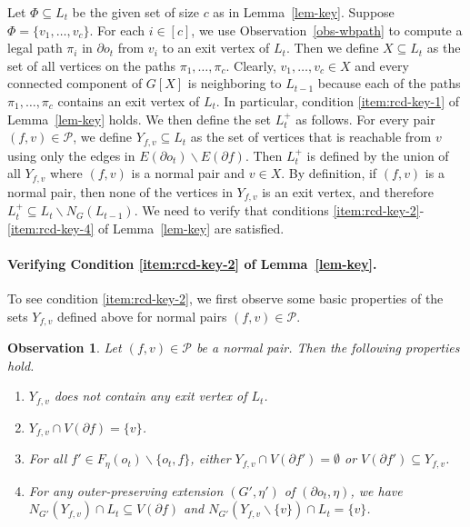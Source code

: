 \documentclass[a4paper,11pt]{article}
\numberwithin{lemma}{section}
\newtheorem{observation}[lemma]{Observation}
\begin{document}
Let $\varPhi \subseteq L_t$ be the given set of size $c$ as in Lemma~\ref{lem-key}.
Suppose $\varPhi = \{v_1,\dots,v_c\}$.
For each $i \in [c]$, we use Observation~\ref{obs-wbpath} to compute a legal path $\pi_i$ in $\partial o_t$ from $v_i$ to an exit vertex of $L_t$.
Then we define $X \subseteq L_t$ as the set of all vertices on the paths $\pi_1,\dots,\pi_c$.
Clearly, $v_1,\dots,v_c \in X$ and every connected component of $G[X]$ is neighboring to $L_{t-1}$ because each of the paths $\pi_1,\dots,\pi_c$ contains an exit vertex of $L_t$.
In particular, condition \ref{item:rcd-key-1} of Lemma~\ref{lem-key} holds.
We then define the set $L_t^+$ as follows.
For every pair $(f,v) \in \mathcal{P}$, we define $Y_{f,v} \subseteq L_t$ as the set of vertices that is reachable from $v$ using only the edges in $E(\partial o_t) \backslash E(\partial f)$.
Then $L_t^+$ is defined by the union of all $Y_{f,v}$ where $(f,v)$ is a normal pair and $v \in X$.
By definition, if $(f,v)$ is a normal pair, then none of the vertices in $Y_{f,v}$ is an exit vertex, and therefore $L_t^+ \subseteq L_t \backslash N_G(L_{t-1})$.
We need to verify that conditions \ref{item:rcd-key-2}-\ref{item:rcd-key-4} of Lemma~\ref{lem-key} are satisfied.

\paragraph{Verifying Condition \ref{item:rcd-key-2} of Lemma~\ref{lem-key}.}
To see condition \ref{item:rcd-key-2}, we first observe some basic properties of the sets $Y_{f,v}$ defined above for normal pairs $(f,v) \in \mathcal{P}$.

\begin{observation} \label{obs-normalprop}
Let $(f,v) \in \mathcal{P}$ be a normal pair.
Then the following properties hold.
\begin{enumerate}[label = (\alph*)]
 \item\label{item:normal-properties-1} $Y_{f,v}$ does not contain any exit vertex of $L_t$.
 \item\label{item:normal-properties-2} $Y_{f,v} \cap V(\partial f) = \{v\}$.
 \item\label{item:normal-properties-3} For all $f' \in F_\eta(o_t) \backslash \{o_t,f\}$, either $Y_{f,v} \cap V(\partial f') = \emptyset$ or $V(\partial f') \subseteq Y_{f,v}$.
 \item\label{item:normal-properties-4} For any outer-preserving extension $(G',\eta')$ of $(\partial o_t,\eta)$, we have $N_{G'}(Y_{f,v}) \cap L_t \subseteq V(\partial f)$ and $N_{G'}(Y_{f,v} \backslash \{v\}) \cap L_t = \{v\}$.
\end{enumerate}
\end{observation}
\end{document}
